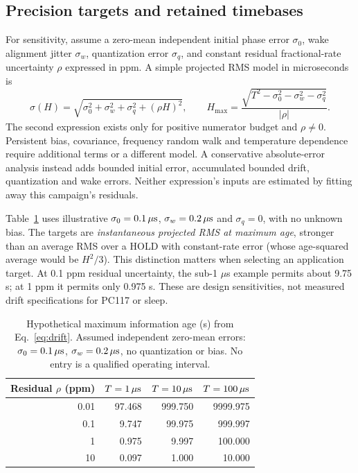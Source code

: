 \documentclass[11pt,letterpaper]{article}
\begin{document}
\subsection{Precision targets and retained timebases}\label{sec:drift}
For sensitivity, assume a zero-mean independent initial phase error $\sigma_0$, wake alignment jitter $\sigma_w$, quantization error $\sigma_q$, and constant residual fractional-rate uncertainty $\rho$ expressed in ppm. A simple projected RMS model in microseconds is
\begin{equation}
 \sigma(H)=\sqrt{\sigma_0^2+\sigma_w^2+\sigma_q^2+(\rho H)^2},\qquad
 H_{\max}=\frac{\sqrt{T^2-\sigma_0^2-\sigma_w^2-\sigma_q^2}}{|\rho|}.\label{eq:drift}
\end{equation}
The second expression exists only for positive numerator budget and $\rho\ne0$. Persistent bias, covariance, frequency random walk and temperature dependence require additional terms or a different model. A conservative absolute-error analysis instead adds bounded initial error, accumulated bounded drift, quantization and wake errors. Neither expression's inputs are estimated by fitting away this campaign's residuals.

Table~\ref{tab:budget} uses illustrative $\sigma_0=0.1\,\mu\mathrm{s}$, $\sigma_w=0.2\,\mu\mathrm{s}$ and $\sigma_q=0$, with no unknown bias. The targets are \emph{instantaneous projected RMS at maximum age}, stronger than an average RMS over a HOLD with constant-rate error (whose age-squared average would be $H^2/3$). This distinction matters when selecting an application target. At 0.1 ppm residual uncertainty, the sub-1 $\mu$s example permits about 9.75 s; at 1 ppm it permits only 0.975 s. These are design sensitivities, not measured drift specifications for PC117 or sleep.

\begin{table}[t]\centering\small
\caption{Hypothetical maximum information age (s) from Eq.~\ref{eq:drift}. Assumed independent zero-mean errors: $\sigma_0=0.1\,\mu\mathrm{s}$, $\sigma_w=0.2\,\mu\mathrm{s}$, no quantization or bias. No entry is a qualified operating interval.}\label{tab:budget}
\begin{tabular}{rrrr}\toprule
Residual $\rho$ (ppm) & $T=1\,\mu\mathrm{s}$ & $T=10\,\mu\mathrm{s}$ & $T=100\,\mu\mathrm{s}$\\\midrule
0.01 & 97.468 & 999.750 & 9999.975\\
0.1 & 9.747 & 99.975 & 999.997\\
1 & 0.975 & 9.997 & 100.000\\
10 & 0.097 & 1.000 & 10.000\\\bottomrule
\end{tabular}
\end{table}
\end{document}
